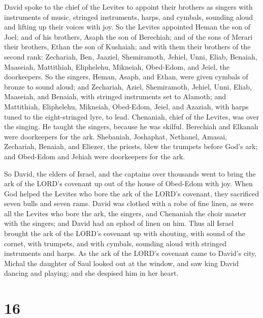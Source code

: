 David spoke to the chief of the Levites to appoint their
brothers as singers with instruments of music, stringed instruments,
harps, and cymbals, sounding aloud and lifting up their voices with joy.
 So the Levites appointed Heman the son of Joel; and of
his brothers, Asaph the son of Berechiah; and of the sons of Merari
their brothers, Ethan the son of Kushaiah;  and with them
their brothers of the second rank: Zechariah, Ben, Jaaziel, Shemiramoth,
Jehiel, Unni, Eliab, Benaiah, Maaseiah, Mattithiah, Eliphelehu,
Mikneiah, Obed-Edom, and Jeiel, the doorkeepers.  So the
singers, Heman, Asaph, and Ethan, were given cymbals of bronze to sound
aloud;  and Zechariah, Aziel, Shemiramoth, Jehiel, Unni,
Eliab, Maaseiah, and Benaiah, with stringed instruments set to Alamoth;
 and Mattithiah, Eliphelehu, Mikneiah, Obed-Edom, Jeiel,
and Azaziah, with harps tuned to the eight-stringed lyre, to lead.
 Chenaniah, chief of the Levites, was over the singing.
He taught the singers, because he was skilful.  Berechiah
and Elkanah were doorkeepers for the ark.  Shebaniah,
Joshaphat, Nethanel, Amasai, Zechariah, Benaiah, and Eliezer, the
priests, blew the trumpets before God's ark; and Obed-Edom and Jehiah
were doorkeepers for the ark.

 So David, the elders of Israel, and the captains over
thousands went to bring the ark of the LORD's covenant up out of the
house of Obed-Edom with joy.  When God helped the Levites
who bore the ark of the LORD's covenant, they sacrificed seven bulls and
seven rams.  David was clothed with a robe of fine linen,
as were all the Levites who bore the ark, the singers, and Chenaniah the
choir master with the singers; and David had an ephod of linen on him.
 Thus all Israel brought the ark of the LORD's covenant
up with shouting, with sound of the cornet, with trumpets, and with
cymbals, sounding aloud with stringed instruments and harps.
 As the ark of the LORD's covenant came to David's city,
Michal the daughter of Saul looked out at the window, and saw king David
dancing and playing; and she despised him in her heart.

\hypertarget{section-15}{%
\section{16}\label{section-15}}

